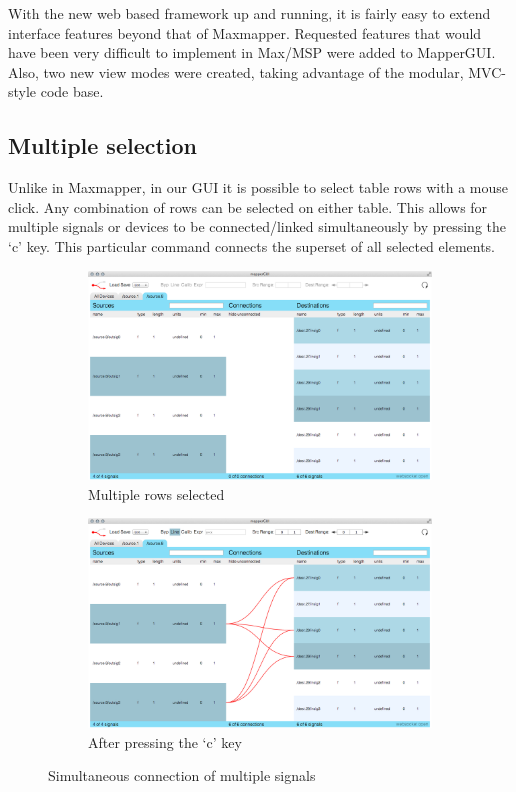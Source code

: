 With the new web based framework up and running, it is fairly easy to extend interface features beyond that of Maxmapper. Requested features that would have been very difficult to implement in Max/MSP were added to MapperGUI. Also, two new view modes were created, taking advantage of the modular, MVC-style code base.

	\subsection{Multiple selection} %
	\label{sub:multiple_selection}

Unlike in Maxmapper, in our GUI it is possible to select table rows with a mouse click. Any combination of rows can be selected on either table. This allows for multiple signals or devices to be connected/linked simultaneously by pressing the `c' key. This particular command connects the superset of all selected elements. 

\begin{figure}
	\centering
	\begin{subfigure}[]{0.49\textwidth}
		\centering
		\includegraphics[width=\textwidth]{figures/multi-select_before_connect}
		\caption{Multiple rows selected}
		\label{fig:multiple_connect_before}
	\end{subfigure}
	\begin{subfigure}[]{0.49\textwidth}
		\centering
		\includegraphics[width=\textwidth]{figures/multi-select_after_connect}
		\caption{After pressing the `c' key}
		\label{fig:multiple_connect_after}
	\end{subfigure}
	\caption{Simultaneous connection of multiple signals}\label{fig:multiple_connect}
\end{figure}


